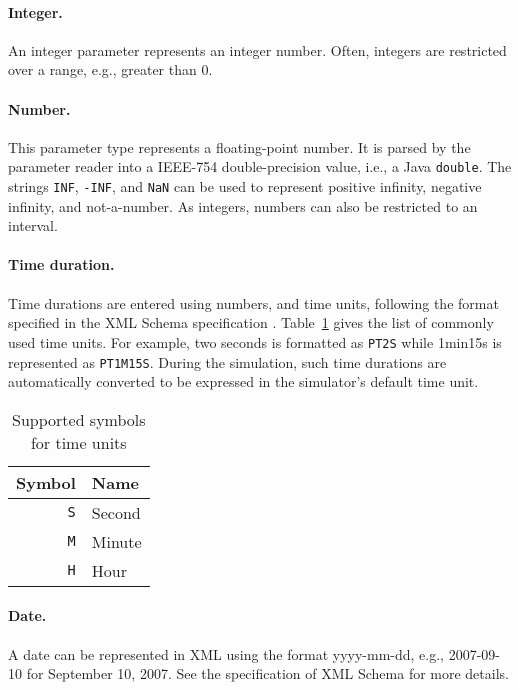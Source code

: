 \paragraph{Integer.} An integer parameter represents an integer
number.
Often, integers are restricted over a range, e.g., greater than 0.

\paragraph{Number.} This parameter type represents a floating-point number.
It is parsed by the parameter reader into a IEEE-754
double-precision value, i.e., a Java \texttt{double}.
The strings \texttt{INF}, \texttt{-INF}, and \texttt{NaN} can be used
to represent positive infinity, negative infinity, and
not-a-number.
As integers, numbers can also be restricted to an interval.

\paragraph{Time duration.}
Time durations are entered using numbers, and time units, following
the format specified in the XML Schema specification \cite{iSPE00a}.
Table~\ref{tab:timeunits} gives the list of commonly used
time units.  For example, two seconds is formatted as
\texttt{PT2S} while 1min15s is represented as
\texttt{PT1M15S}.
During the simulation, such time durations are automatically
converted to be expressed in the simulator's default time unit.

\begin{table}[htb]
  \caption{Supported symbols for time units}
  \label{tab:timeunits}
  \centering
  \begin{tabular}{|rl|}\hline
    Symbol&Name\\\hline
    \texttt{S}&Second\\
    \texttt{M}&Minute\\
    \texttt{H}&Hour\\ \hline
  \end{tabular}
\end{table}

\paragraph{Date.}
A date can be represented in XML using the format
yyyy-mm-dd, e.g.,
2007-09-10 for September 10, 2007.
See the specification of XML Schema \cite{iSPE00a}
for more details.

